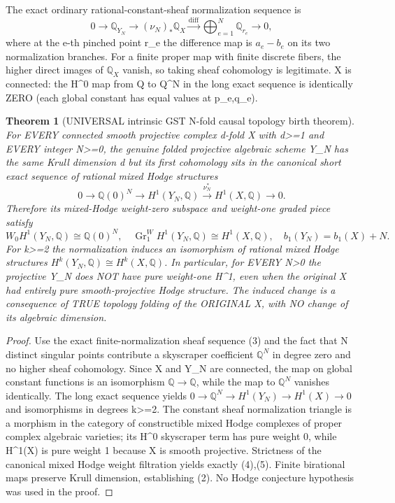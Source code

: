 \documentclass[11pt]{article}
\newcommand{\Q}{\mathbb Q}
\newcommand{\Gr}{\operatorname{Gr}}
\newtheorem{theorem}{Theorem}
\begin{document}
The exact ordinary rational-constant-sheaf
normalization sequence is
\[
 0\longrightarrow \Q_{Y_N}
 \longrightarrow (\nu_N)_*\Q_X
 \xrightarrow{\mathrm{diff}}
 \bigoplus_{e=1}^N\Q_{r_e}
 \longrightarrow 0,                                  \tag{3}
\]
where at the e-th pinched point r_e the difference
map is \(a_e-b_e\) on its two normalization branches.
For a finite proper map with finite discrete fibers,
the higher direct images of \(\Q_X\) vanish,
so taking sheaf cohomology is legitimate.
X is connected: the H^0 map from Q to Q^N
in the long exact sequence is identically ZERO
(each global constant has equal values at p_e,q_e).

\begin{theorem}[UNIVERSAL intrinsic GST N-fold causal topology birth theorem]
For EVERY connected smooth projective complex
d-fold X with d>=1 and EVERY integer N>=0,
the genuine folded projective algebraic scheme Y_N
has the same Krull dimension d but its first
cohomology sits in the canonical short exact sequence
of rational mixed Hodge structures
\[
 \boxed{
 0\longrightarrow\Q(0)^N
 \longrightarrow H^1(Y_N,\Q)
 \xrightarrow{\nu_N^*}H^1(X,\Q)
 \longrightarrow0.
 }                                                        \tag{4}
\]
Therefore its mixed-Hodge weight-zero subspace and
weight-one graded piece satisfy
\[
 \boxed{
  W_0H^1(Y_N,\Q)\cong\Q(0)^N,\quad
  \Gr^W_1H^1(Y_N,\Q)\cong H^1(X,\Q),\quad
  b_1(Y_N)=b_1(X)+N.
 }                                                        \tag{5}
\]
For k>=2 the normalization induces an isomorphism
of rational mixed Hodge structures
\(H^k(Y_N,\Q)\cong H^k(X,\Q)\).
In particular, for EVERY N>0 the projective
Y_N does NOT have pure weight-one H^1,
even when the original X had entirely pure
smooth-projective Hodge structure.
The induced change is a consequence of TRUE
topology folding of the ORIGINAL X, with
NO change of its algebraic dimension.
\end{theorem}
\begin{proof}
Use the exact finite-normalization sheaf
sequence (3) and the fact that N distinct
singular points contribute a skyscraper
coefficient \(\Q^N\) in degree zero and no
higher sheaf cohomology.
Since X and Y_N are connected, the map on
global constant functions is an isomorphism
\(\Q\to\Q\), while the map to \(\Q^N\)
vanishes identically.
The long exact sequence yields
\(0\to\Q^N\to H^1(Y_N)\to H^1(X)\to0\)
and isomorphisms in degrees k>=2.
The constant sheaf normalization triangle
is a morphism in the category of
constructible mixed Hodge complexes of
proper complex algebraic varieties;
its H^0 skyscraper term has pure
weight 0, while H^1(X) is pure weight 1
because X is smooth projective.
Strictness of the canonical mixed Hodge
weight filtration yields exactly (4),(5).
Finite birational maps preserve Krull
dimension, establishing (2).
No Hodge conjecture hypothesis was
used in the proof.
\end{proof}
\end{document}
